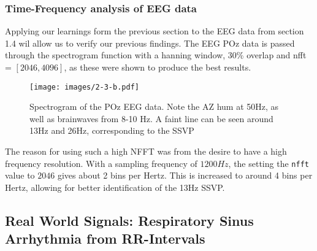 \documentclass[main.tex]{subfiles}
\begin{document}
\subsubsection{Time-Frequency analysis of EEG data}

Applying our learnings form the previous section to the EEG data from section 1.4 wil allow us to verify our previous findings. The EEG POz data is passed through the spectrogram function with a hanning window, 30\% overlap and nfft = $[2046, 4096]$, as these were shown to produce the best results.

\begin{figure}[h]
	\centering
	\texttt{[image: images/2-3-b.pdf]}
	\caption{Spectrogram of the POz EEG data. Note the AZ hum at 50Hz, as well as brainwaves from 8-10 Hz. A faint line can be seen around 13Hz and 26Hz, corresponding to the SSVP}
	\label{fig:2-3-b}
\end{figure}

The reason for using such a high NFFT was from the desire to have a high frequency resolution. With a sampling frequency of $1200Hz$, the setting the {\tt nfft} value to $2046$ gives about 2 bins per Hertz. This is increased to around 4 bins per Hertz, allowing for better identification of the 13Hz SSVP.


\subsection{Real World Signals: Respiratory Sinus Arrhythmia from RR-Intervals}

\pagebreak
\end{document}
